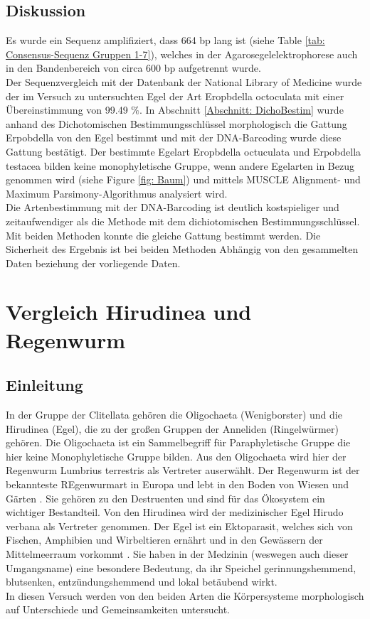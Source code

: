 \documentclass[oneside,10pt,a4paper]{report}
\begin{document}
			\subsection{Diskussion}
				Es wurde ein Sequenz amplifiziert, dass 664 bp lang ist (siehe Table \ref{tab: Consensus-Sequenz Gruppen 1-7}), welches in der Agarosegelelektrophorese auch in den Bandenbereich von circa 600 bp aufgetrennt wurde.\\
				Der Sequenzvergleich mit der Datenbank der National Library of Medicine wurde der im Versuch zu untersuchten Egel der Art Eropbdella octoculata mit einer Übereinstimmung von 99.49 $\%$.  
				In Abschnitt \ref{Abschnitt: DichoBestim} wurde anhand des Dichotomischen Bestimmungsschlüssel morphologisch die Gattung Erpobdella von den Egel bestimmt und mit der DNA-Barcoding wurde diese Gattung bestätigt.
				Der bestimmte Egelart Eropbdella octuculata und Erpobdella testacea bilden keine monophyletische Gruppe, wenn andere Egelarten in Bezug genommen wird (siehe Figure \ref{fig: Baum}) und mittels MUSCLE Alignment- und Maximum Parsimony-Algorithmus analysiert wird.\\
				Die Artenbestimmung mit der DNA-Barcoding ist deutlich kostspieliger und zeitaufwendiger als die Methode mit dem dichiotomischen Bestimmungsschlüssel. Mit beiden Methoden konnte die gleiche Gattung bestimmt werden.
				Die Sicherheit des Ergebnis ist bei beiden Methoden Abhängig von den gesammelten Daten beziehung der vorliegende Daten.\\
				
		\section{Vergleich Hirudinea und Regenwurm}
			\subsection{Einleitung}
				In der Gruppe der Clitellata gehören die Oligochaeta (Wenigborster) und die Hirudinea (Egel), die zu der großen Gruppen der Anneliden (Ringelwürmer) gehören.
				Die Oligochaeta ist ein Sammelbegriff für Paraphyletische Gruppe die hier keine Monophyletische Gruppe bilden. Aus den Oligochaeta wird hier der Regenwurm Lumbrius terrestris als Vertreter auserwählt. Der Regenwurm ist der bekannteste REgenwurmart in Europa und lebt in den Boden von Wiesen und Gärten \cite{regenwurm}. Sie gehören zu den Destruenten und sind für das Ökosystem ein wichtiger Bestandteil. Von den Hirudinea wird der medizinischer Egel Hirudo verbana als Vertreter genommen. Der Egel ist ein Ektoparasit, welches sich von Fischen, Amphibien und Wirbeltieren ernährt  und in den Gewässern der Mittelmeerraum vorkommt \cite{hirudo}. Sie haben in der Medzinin (weswegen auch dieser Umgangsname) eine besondere Bedeutung, da ihr Speichel gerinnungshemmend, blutsenken, entzündungshemmend und lokal betäubend wirkt.\\
				In diesen Versuch werden von den beiden Arten die Körpersysteme morphologisch auf Unterschiede und Gemeinsamkeiten untersucht.\\
				
\end{document}
